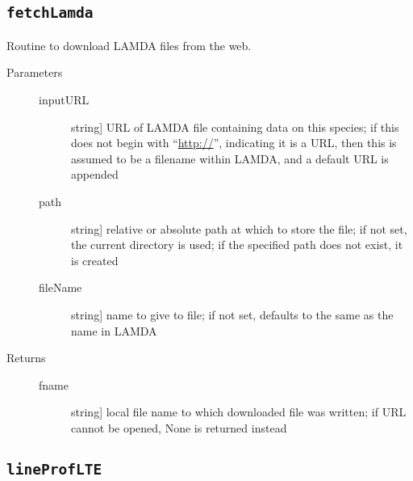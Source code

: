 \documentclass[letterpaper,10pt,english]{sphinxmanual}
\begin{document}
\subsection{\texttt{fetchLamda}}
\label{fulldoc:fetchlamda}

\begin{fulllineitems}
\label{fulldoc:despotic.fetchLamda}
Routine to download LAMDA files from the web.
\begin{description}
\item[{Parameters}] \leavevmode\begin{description}
\item[{inputURL}] \leavevmode{[}string{]}
URL of LAMDA file containing data on this species; if this
does not begin with ``\url{http://}'', indicating it is a URL, then
this is assumed to be a filename within LAMDA, and a default
URL is appended

\item[{path}] \leavevmode{[}string{]}
relative or absolute path at which to store the file; if not
set, the current directory is used; if the specified path does
not exist, it is created

\item[{fileName}] \leavevmode{[}string{]}
name to give to file; if not set, defaults to the same as the
name in LAMDA

\end{description}

\item[{Returns}] \leavevmode\begin{description}
\item[{fname}] \leavevmode{[}string{]}
local file name to which downloaded file was written; if URL
cannot be opened, None is returned instead

\end{description}

\end{description}

\end{fulllineitems}



\subsection{\texttt{lineProfLTE}}
\label{fulldoc:sssec-full-lineproflte}\label{fulldoc:lineproflte}
\end{document}
